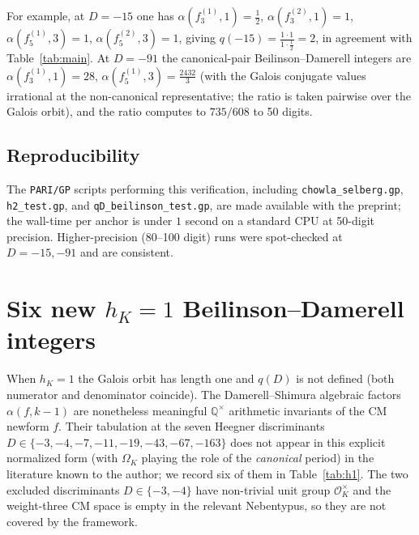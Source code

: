 \documentclass[11pt,a4paper]{amsart}
\theoremstyle{plain}
\theoremstyle{definition}
\newcommand{\Q}{\mathbb{Q}}
\newcommand{\OK}{\mathcal{O}_K}
\begin{document}
For example, at $D=-15$ one has $\alpha(f_3^{(1)},1)=\tfrac{1}{2}$,
$\alpha(f_3^{(2)},1)=1$,
$\alpha(f_5^{(1)},3)=1$, $\alpha(f_5^{(2)},3)=1$, giving
$q(-15)=\tfrac{1\cdot 1}{1\cdot\tfrac{1}{2}}=2$, in agreement with
Table~\ref{tab:main}. At $D=-91$ the canonical-pair Beilinson--Damerell
integers are $\alpha(f_3^{(1)},1)=28$, $\alpha(f_5^{(1)},3)=\tfrac{2432}{3}$
(with the Galois conjugate values irrational at the
non-canonical representative; the ratio is taken pairwise over the
Galois orbit), and the ratio computes to $735/608$ to 50 digits.

\subsection{Reproducibility}

The \texttt{PARI/GP} scripts performing this verification, including
\texttt{chowla\_selberg.gp}, \texttt{h2\_test.gp}, and
\texttt{qD\_beilinson\_test.gp}, are made available with the preprint;
the wall-time per anchor is under $1$ second on a standard CPU at
50-digit precision. Higher-precision (80--100 digit) runs were spot-checked
at $D=-15,-91$ and are consistent.

\section{Six new $h_K=1$ Beilinson--Damerell integers}
\label{sec:h1}

When $h_K=1$ the Galois orbit has length one and $q(D)$ is not defined
(both numerator and denominator coincide). The Damerell--Shimura algebraic
factors $\alpha(f,k-1)$ are nonetheless meaningful $\Q^{\times}$
arithmetic invariants of the CM newform $f$. Their tabulation at the
seven Heegner discriminants
$D\in\{-3,-4,-7,-11,-19,-43,-67,-163\}$ does not appear in this
explicit normalized form (with $\Omega_K$ playing the role of the
\emph{canonical} period) in the literature known to the author;
we record six of them in Table~\ref{tab:h1}. The two excluded
discriminants $D\in\{-3,-4\}$ have non-trivial unit group $\OK^{\times}$
and the weight-three CM space is empty in the relevant Nebentypus, so
they are not covered by the framework.
\end{document}
